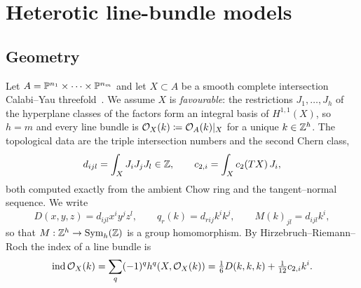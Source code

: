 \section{Heterotic line-bundle models}
\label{sec:setup}

\subsection{Geometry}

Let $A=\mathbb{P}^{n_1}\times\cdots\times\mathbb{P}^{n_m}$ and let $X\subset A$ be a smooth
complete intersection Calabi--Yau threefold~\cite{CDLS1988,GHL1989,Hubsch1992}. We
assume $X$ is \emph{favourable}: the restrictions $J_1,\dots,J_h$ of the
hyperplane classes of the factors form an integral basis of $H^{1,1}(X)$, so
$h=m$ and every line bundle is $\mathcal{O}_X(k)\coloneqq\mathcal{O}_A(k)|_X$ for a unique
$k\in\mathbb{Z}^h$. The topological data are the triple intersection numbers and the
second Chern class,
\begin{equation}
d_{ijl}=\int_X J_iJ_jJ_l\in\mathbb{Z},\qquad c_{2,i}=\int_X c_2(TX)\,J_i ,
\end{equation}
both computed exactly from the ambient Chow ring and the tangent--normal
sequence. We write
\begin{equation}\label{eq:notation}
D(x,y,z)=d_{ijl}x^iy^jz^l,\qquad
q_r(k)=d_{rij}k^ik^j,\qquad
M(k)_{jl}=d_{ijl}k^i,
\end{equation}
so that $M:\mathbb{Z}^h\to\operatorname{Sym}_h(\mathbb{Z})$ is a group homomorphism. By
Hirzebruch--Riemann--Roch the index of a line bundle is
\begin{equation}\label{eq:hrr}
\operatorname{ind}\mathcal{O}_X(k)=\sum_q(-1)^q h^q(X,\mathcal{O}_X(k))=\tfrac16D(k,k,k)+\tfrac1{12}c_{2,i}k^i .
\end{equation}

